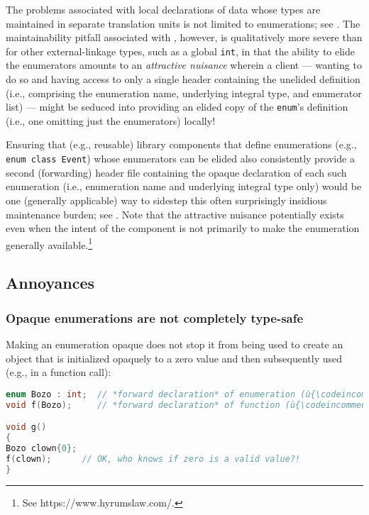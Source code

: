 The problems associated with local declarations of data whose types are
maintained in separate translation units is not limited to enumerations;
see . The maintainability pitfall associated with
, however, is qualitatively more severe than
for other external-linkage types, such as a global \lstinline!int!, in that
the ability to elide the enumerators amounts to an \emph{attractive
nuisance} wherein a client --- wanting to do so and having access to
only a single header containing the unelided definition (i.e.,
comprising the enumeration name, underlying integral type, and
enumerator list) --- might be seduced into providing an elided copy of
the \lstinline!enum!'s definition (i.e., one omitting just the enumerators)
locally!

Ensuring that (e.g., reusable) library components that define
enumerations (e.g., \lstinline!enum!~\lstinline!class!~\lstinline!Event!) whose
enumerators can be elided also consistently provide a second
(forwarding) header file containing the opaque declaration of each such
enumeration (i.e., enumeration name and underlying integral type only)
would be one (generally applicable) way to sidestep this often
surprisingly insidious maintenance burden; see . Note that the attractive
nuisance potentially exists even when the intent of the component is not
primarily to make the enumeration generally
available.{\cprotect\footnote{See https://www.hyrumslaw.com/.}}

\subsection[Annoyances]{Annoyances}\label{annoyances}

\subsubsection[Opaque enumerations are not completely type-safe]{Opaque enumerations are not completely type-safe}\label{opaque-enumerations-are-not-completely-type-safe}

Making an enumeration opaque does not stop it from being used to create
an object that is initialized opaquely to a zero value and then
subsequently used (e.g., in a function call):

\begin{lstlisting}[language=C++]
enum Bozo : int;  // *forward declaration* of enumeration (ù{\codeincomments{Bozo}}ù)
void f(Bozo);     // *forward declaration* of function (ù{\codeincomments{f}}ù)

void g()
{
Bozo clown{0};
f(clown);      // OK, who knows if zero is a valid value?!
}
\end{lstlisting}

